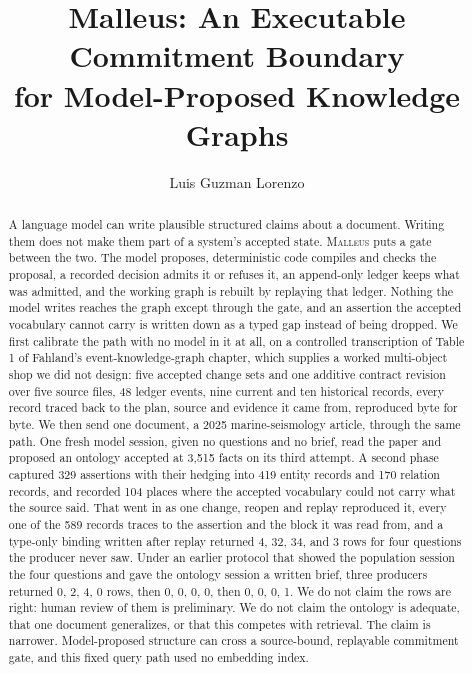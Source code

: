 \documentclass[10pt]{article}
\title{Malleus: An Executable Commitment Boundary\\for Model-Proposed Knowledge Graphs}
\author{Luis Guzman Lorenzo}
\date{}
\newcommand{\malleus}{\textsc{Malleus}}
\begin{document}
\maketitle

\begin{abstract}
A language model can write plausible structured claims about a document. Writing them does not make them part of a system's accepted state. \malleus{} puts a gate between the two. The model proposes, deterministic code compiles and checks the proposal, a recorded decision admits it or refuses it, an append-only ledger keeps what was admitted, and the working graph is rebuilt by replaying that ledger. Nothing the model writes reaches the graph except through the gate, and an assertion the accepted vocabulary cannot carry is written down as a typed gap instead of being dropped. We first calibrate the path with no model in it at all, on a controlled transcription of Table 1 of Fahland's event-knowledge-graph chapter, which supplies a worked multi-object shop we did not design: five accepted change sets and one additive contract revision over five source files, 48 ledger events, nine current and ten historical records, every record traced back to the plan, source and evidence it came from, reproduced byte for byte. We then send one document, a 2025 marine-seismology article, through the same path. One fresh model session, given no questions and no brief, read the paper and proposed an ontology accepted at 3,515 facts on its third attempt. A second phase captured 329 assertions with their hedging into 419 entity records and 170 relation records, and recorded 104 places where the accepted vocabulary could not carry what the source said. That went in as one change, reopen and replay reproduced it, every one of the 589 records traces to the assertion and the block it was read from, and a type-only binding written after replay returned 4, 32, 34, and 3 rows for four questions the producer never saw. Under an earlier protocol that showed the population session the four questions and gave the ontology session a written brief, three producers returned 0, 2, 4, 0 rows, then 0, 0, 0, 0, then 0, 0, 0, 1. We do not claim the rows are right: human review of them is preliminary. We do not claim the ontology is adequate, that one document generalizes, or that this competes with retrieval. The claim is narrower. Model-proposed structure can cross a source-bound, replayable commitment gate, and this fixed query path used no embedding index.
\end{abstract}
\end{document}
